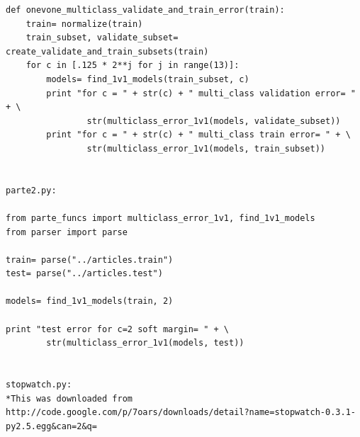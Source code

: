 \documentclass[12pt]{article}
\begin{document}
\begin{lstlisting}
def onevone_multiclass_validate_and_train_error(train):
    train= normalize(train)
    train_subset, validate_subset= create_validate_and_train_subsets(train)
    for c in [.125 * 2**j for j in range(13)]:
        models= find_1v1_models(train_subset, c)
        print "for c = " + str(c) + " multi_class validation error= " + \
                str(multiclass_error_1v1(models, validate_subset))
        print "for c = " + str(c) + " multi_class train error= " + \
                str(multiclass_error_1v1(models, train_subset))


parte2.py:

from parte_funcs import multiclass_error_1v1, find_1v1_models
from parser import parse

train= parse("../articles.train")
test= parse("../articles.test")

models= find_1v1_models(train, 2)

print "test error for c=2 soft margin= " + \
        str(multiclass_error_1v1(models, test))


stopwatch.py:
*This was downloaded from http://code.google.com/p/7oars/downloads/detail?name=stopwatch-0.3.1-py2.5.egg&can=2&q=


\end{lstlisting}
\end{document}
